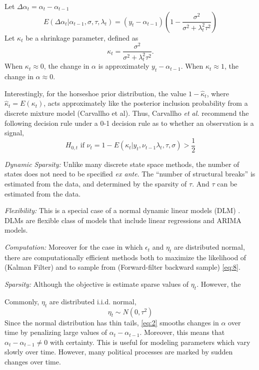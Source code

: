 \documentclass{article}
\begin{document}
Let $\Delta \alpha_{t} = \alpha_{t} - \alpha_{t - 1}$
\begin{equation}
  \label{eq:10}
  E(\Delta \alpha_{t} | \alpha_{t - 1}, \sigma, \tau, \lambda_{t}) = (y_{t} - \alpha_{t - 1})
  \left(
    1 - \frac{\sigma^{2}}{\sigma^{2} + \lambda^{2}_{t} \tau^{2}}
  \right)
\end{equation}
Let $\kappa_{t}$ be a shrinkage parameter, defined as
\begin{equation}
  \label{eq:3}
  \kappa_{t} = \frac{\sigma^{2}}{\sigma^{2} + \lambda^{2}_{t} \tau^{2}} \text{.}
\end{equation}
When $\kappa_{t} \approx 0$, the change in $\alpha$ is approximately $y_{t} - \alpha_{t-1}$.
When $\kappa_{t} \approx 1$, the change in $\alpha \approx 0$.

Interestingly, for the horseshoe prior distribution, the value $1 - \hat\kappa_{t}$, where $\hat\kappa_{t} = E(\kappa_{t})$, acts approximately like the posterior inclusion probability from a discrete mixture model (Carvallho et al).
Thus, Carvallho \textit{et al.} recommend the following  decision rule under a 0-1 decision rule as to whether an observation is a signal,
\begin{equation}
  \label{eq:5}
  \text{$H_{0,t}$ if $\nu_{t} = 1 - E(\kappa_{t}|y_{t}, \nu_{t-1} \lambda_{t}, \tau, \sigma) > \frac{1}{2}$}
\end{equation}

\textit{Dynamic Sparsity:} Unlike many discrete state space methods, the number of states does not need to be specified \textit{ex ante}.
The ``number of structural breaks'' is estimated from the data, and determined by the sparsity of $\tau$. 
And $\tau$ can be estimated from the data.

\textit{Flexibility:} This is a special case of a normal dynamic linear models (DLM) \parencites{WestHarrison1997}{DurbinKoopman2012}{CommandeurKoopman2007}{ShumwayStoffer2010}.
DLMs are flexible class of models that include linear regressions and ARIMA models.

\textit{Computation:} Moreover for the case in which $\epsilon_{t}$ and $\eta_{t}$ are distributed normal, there are computationally efficient methods both to maximize the likelihood of (Kalman Filter) and to sample from (Forward-filter backward sample) \eqref{eq:8}.

\textit{Sparsity:} Although the objective is estimate sparse values of $\eta_{t}$. However, the 

Commonly, $\eta_{t}$ are distributed i.i.d. normal,
\begin{equation}
  \label{eq:2}
  \eta_{t} \sim N(0, \tau^{2})
\end{equation}
Since the normal distribution has thin tails, \eqref{eq:2} smooths changes in $\alpha$ over time by penalizing large values of $\alpha_{t} - \alpha_{t-1}$.
Moreover, this means that $\alpha_{t} - \alpha_{t-1} \neq 0$ with certainty.
This is useful for modeling parameters which vary slowly over time.
However, many political processes are marked by sudden changes over time.
\end{document}

